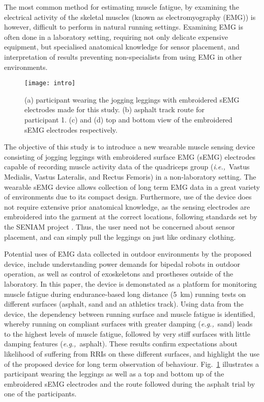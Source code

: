 \documentclass[letterpaper, 10 pt, conference]{ieeeconf}
\newcommand{\rg}[1]{{\scriptsize\color{blue}[RG: #1]}}
\renewcommand{\rg}[1]{}
\newcommand{\fref}[1]{Fig.~\ref{#1}}       \newcommand{\sref}[1]{\S\ref{#1}}          \newcommand{\tref}[1]{\tablename~\ref{#1}} \newcommand{\eref}[1]{(\ref{#1})}
\newcommand{\eg}[1]{\textit{e.g.,}~#1} \newcommand{\ie}[1]{\textit{i.e.,}~#1}
\begin{document}
The most common method for estimating muscle fatigue, by examining the
electrical activity of the skeletal muscles (known as electromyography (EMG))
is however, difficult to perform in natural running settings. Examining EMG is
often done in a laboratory setting, requiring not only delicate expensive
equipment, but specialised anatomical knowledge for sensor placement, and
interpretation of results preventing non-specialists
from using EMG in other environments.

\begin{figure}[t!]\centering \texttt{[image: intro]}
	\caption{(a) participant wearing the jogging leggings with embroidered sEMG electrodes made for this study. (b) asphalt track route for participant 1. (c) and (d) top and bottom view of the embroidered sEMG electrodes respectively.}
    \label{f:intro}
\end{figure}

The objective of this study is to introduce a new wearable muscle sensing
device consisting of jogging leggings with embroidered surface EMG (sEMG)
electrodes capable of recording muscle activity data of the quadriceps group
(\ie{Vastus Medialis, Vastus Lateralis, and Rectus Femoris}) in a
non-laboratory setting. 
The wearable sEMG device allows \rg{collecting long term.../the collection of long term...} collection of long
term EMG data in a great variety of environments due to its compact design.
Furthermore, \rg{the use} use of the device does not require extensive prior anatomical
knowledge, as the sensing electrodes are embroidered into the garment at the
correct locations, following standards set by the SENIAM project
\cite{hermens1999european}. Thus, the user \rg{does not need to} need not be concerned about sensor
placement, and can simply pull the leggings on just like ordinary clothing.

Potential uses of EMG data collected in outdoor environments by the proposed
device, include understanding power demands for bipedal robots in outdoor
operation, as well as control of exoskeletons and prostheses outside of the
laboratory. In this paper, the device is demonstated as a platform for
monitoring muscle fatigue during endurance-based long distance
({\SI{5}{\kilo\meter}}) running tests on different surfaces (asphalt, sand and
an athletics track). Using data from the device, the dependency between running
surface and muscle fatigue is identified, whereby running on compliant surfaces
with greater damping (\eg{sand}) leads to the highest levels of muscle fatigue,
followed by very stiff surfaces with little damping features (\eg{asphalt}). These
results confirm expectations about likelihood of suffering from RRIs on these
different surfaces, and highlight the use of the proposed device for long term
observation of behaviour. \fref{f:intro} illustrates a participant wearing the leggings as well as a top and bottom up of the embroidered sEMG electrodes and the route followed during the asphalt trial by one of the participants.
\end{document}
